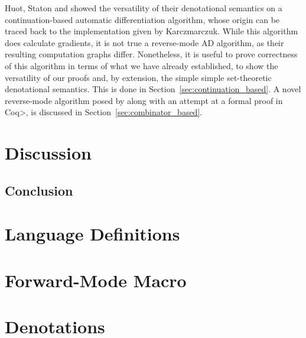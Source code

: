 \documentclass[11pt, final]{article}
\begin{document}
  Huot, Staton and \Vakar{} showed the versatility of their denotational semantics on a continuation-based automatic differentiation algorithm, whose origin can be traced back to the implementation given by Karczmarczuk\cite{Karczmarczuk98functionaldifferentiation}.
  While this algorithm does calculate gradients, it is not true a reverse-mode AD algorithm, as their resulting computation graphs differ\cite{PearlmutterSiskind2008}.
  Nonetheless, it is useful to prove correctness of this algorithm in terms of what we have already established, to show the versatility of our proofs and, by extension, the simple simple set-theoretic denotational semantics.
  This is done in Section~\ref{sec:continuation_based}.
  A novel reverse-mode algorithm posed by \Vakar{}\cite{} along with an attempt at a formal proof in \<Coq>, is discussed in Section~\ref{sec:combinator_based}. %
  
  
\section{Discussion}
  
  \subsection{Conclusion}

\appendix
\section{Language Definitions}
\section{Forward-Mode Macro}
\section{Denotations}
\printbibliography
\makeatother
\end{document}
